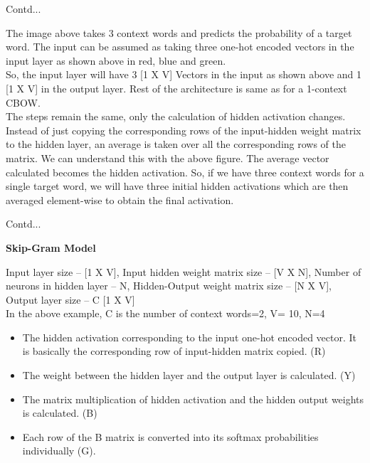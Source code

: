 \documentclass{beamer}
\newcommand\myheading[1]{%
  \par\bigskip
  {\Large\bfseries#1}\par\smallskip}
\begin{document}
\begin{frame}{Contd...}
	\begin{flushleft}
		The image above takes 3 context words and predicts the probability of a target word. The input can be assumed as taking three one-hot encoded vectors in the input layer as shown above in red, blue and green.\\
\vspace{10pt}
So, the input layer will have 3 [1 X V] Vectors in the input as shown above and 1 [1 X V] in the output layer. Rest of the architecture is same as for a 1-context CBOW.\\
\vspace{10pt}
The steps remain the same, only the calculation of hidden activation changes. Instead of just copying the corresponding rows of the input-hidden weight matrix to the hidden layer, an average is taken over all the corresponding rows of the matrix. We can understand this with the above figure. The average vector calculated becomes the hidden activation. So, if we have three context words for a single target word, we will have three initial hidden activations which are then averaged element-wise to obtain the final activation.
	\end{flushleft}
\end{frame}
\begin{frame}{Contd...}
	\begin{flushleft}
	\myheading{Skip-Gram Model}
	Input layer  size – [1 X V], Input hidden weight matrix size – [V X N], Number of neurons in hidden layer – N, Hidden-Output weight matrix size – [N X V], Output layer size – C [1 X V]\\
\vspace{10pt}
In the above example, C is the number of context words=2, V= 10, N=4
		\begin{itemize}
			\item The hidden activation corresponding to the input one-hot encoded vector. It is basically the corresponding row of input-hidden matrix copied. (R)
			\item The weight between the hidden layer and the output layer is calculated. (Y)
			\item The matrix multiplication of hidden activation and the hidden output weights is calculated. (B)
			\item Each row of the B matrix is converted into its softmax probabilities individually (G).
		\end{itemize}
	\end{flushleft}
\end{frame}
\end{document}
